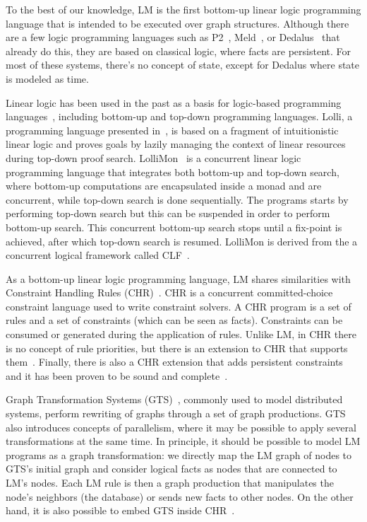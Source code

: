 
To the best of our knowledge, LM is the first bottom-up linear logic programming language
that is intended to be executed over graph structures. Although there are a few logic programming languages such as P2~\cite{Loo-condie-garofalakis-p2},
Meld~\cite{ashley-rollman-iclp09}, or Dedalus~\cite{Alvaro:EECS-2009-173} that already do this, they are based on classical logic, where facts are persistent. For most of these systems, there's no concept of state, except for Dedalus where state is modeled as time.

Linear logic has been used in the past as a basis for logic-based programming languages~\cite{Miller85anoverview}, including bottom-up and top-down programming languages. Lolli, a programming language presented in~\cite{Hodas94logicprogramming}, is based on a fragment of intuitionistic linear logic
and proves goals by lazily managing the context of linear resources during top-down proof search. LolliMon~\cite{Lopez:2005:MCL:1069774.1069778} is a concurrent linear logic programming language that integrates both bottom-up and top-down search, where bottom-up computations are encapsulated inside a monad and are concurrent, while top-down search is done sequentially. The programs starts by performing top-down search but this can be suspended in order to perform bottom-up search. This concurrent bottom-up search stops until a fix-point is achieved, after which top-down search is resumed. LolliMon is derived from the a concurrent logical framework called CLF~\cite{Watkins:2004uq,Cervesato02aconcurrent,Watkins03aconcurrent}.

As a bottom-up linear logic programming language, LM shares similarities with Constraint Handling Rules (CHR)~\cite{Betz:2005kx,Betz:2013:LBA:2422085.2422086}.
CHR is a concurrent committed-choice constraint language used to write constraint solvers. A CHR program is a set of rules and
a set of constraints (which can be seen as facts). Constraints can be consumed or generated during the application of rules.
Unlike LM, in CHR there is no
concept of rule priorities, but there is an extension to CHR that supports them~\cite{DeKoninck:2007:URP:1273920.1273924}.
Finally, there is also a CHR extension that adds persistent constraints and it has been proven to be sound and complete~\cite{DBLP:journals/corr/abs-1007-3829}.

Graph Transformation Systems (GTS)~\cite{Ehrig:2004vn}, commonly used to model distributed systems, perform rewriting of graphs through
a set of graph productions. GTS also introduces
concepts of parallelism, where it may be possible to apply several transformations at the same time. In principle, it should be possible to model
LM programs as a graph transformation: we directly map the LM graph of nodes to GTS's initial graph and consider logical facts as nodes that are connected
to LM's nodes. Each LM rule is then a graph production that manipulates the node's neighbors (the database) or sends new facts to other nodes.
On the other hand, it is also possible to embed GTS inside CHR~\cite{Raiser:2011:AGT:1972935.1972938}.

\vspace{-4mm}